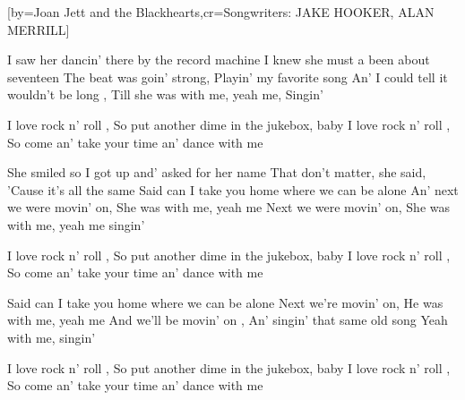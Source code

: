  

[by={Joan Jett and the Blackhearts},cr={Songwriters: JAKE HOOKER, ALAN MERRILL}]


\beginverse
I saw her dancin' there by the record machine 
I knew she must a been about seventeen 
The beat was goin' strong, \brk  Playin' my favorite song 
 An' I could tell it wouldn't be long , \brk  Till she was with me, yeah me, 
Singin' 
\endverse

\beginchorus
I love rock n' roll , \brk  So put another dime in the jukebox, baby 
I love rock n' roll , \brk  So come an' take your time an' dance with me 
\endchorus

\beginverse
She smiled so I got up and' asked for her name 
That don't matter, she said, \brk  'Cause it's all the same 
Said can I take you home where we can be alone 
An' next we were movin' on, \brk  She was with me, yeah me 
Next we were movin' on, \brk  She was with me, yeah me singin'
\endverse

\beginchorus
I love rock n' roll , \brk  So put another dime in the jukebox, baby 
I love rock n' roll , \brk  So come an' take your time an' dance with me 
\endchorus

\beginverse
[SOLO]
\endverse

\beginverse
Said can I take you home where we can be alone 
Next we're movin' on, \brk  He was with me, yeah me 
And we'll be movin' on , \brk  An' singin' that same old song 
Yeah with me, singin' 
\endverse

\beginchorus
{} I love rock n' roll , \brk  So put another dime in the jukebox, baby 
I love rock n' roll , \brk  So come an' take your time an' dance with me 
\endchorus






\endsong
